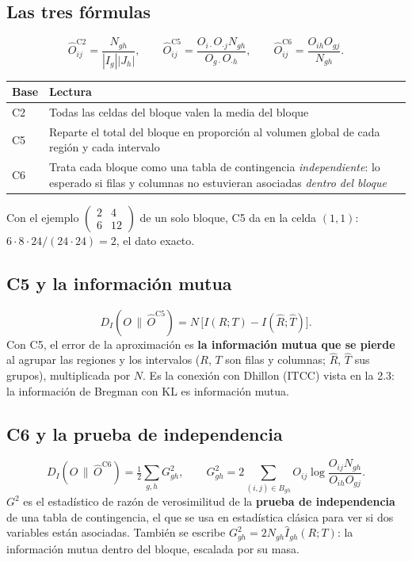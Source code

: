 \documentclass[11pt,a4paper]{article}
\begin{document}
\subsection{Las tres fórmulas}

\[
  \hat O^{\mathrm{C2}}_{ij}=\frac{N_{gh}}{|I_g||J_h|},\qquad
  \hat O^{\mathrm{C5}}_{ij}=\frac{O_{i\cdot}O_{\cdot j}N_{gh}}{O_{g\cdot}O_{\cdot h}},\qquad
  \hat O^{\mathrm{C6}}_{ij}=\frac{O_{ih}O_{gj}}{N_{gh}}.
\]
\begin{center}
\renewcommand{\arraystretch}{1.3}
\begin{tabular}{@{}l>{\raggedright\arraybackslash}p{12.4cm}@{}}
\toprule
\textbf{Base} & \textbf{Lectura} \\
\midrule
C2 & Todas las celdas del bloque valen la media del bloque \\
\midrule
C5 & Reparte el total del bloque en proporción al volumen global de cada región y cada intervalo \\
\midrule
C6 & Trata cada bloque como una tabla de contingencia \emph{independiente}: lo esperado si filas y columnas no estuvieran asociadas \emph{dentro del bloque} \\
\bottomrule
\end{tabular}
\end{center}
Con el ejemplo $\begin{pmatrix}2&4\\6&12\end{pmatrix}$ de un solo bloque, C5 da en
la celda $(1,1)$: $6\cdot8\cdot24/(24\cdot24)=2$, el dato exacto.

\subsection{C5 y la información mutua}

\[
  D_I(O\,\|\,\hat O^{\mathrm{C5}})=N\,\bigl[I(R;T)-I(\hat R;\hat T)\bigr].
\]
Con C5, el error de la aproximación es \textbf{la información mutua que se pierde}
al agrupar las regiones y los intervalos ($R$, $T$ son filas y columnas; $\hat R$,
$\hat T$ sus grupos), multiplicada por $N$. Es la conexión con Dhillon (ITCC) vista
en la 2.3: la información de Bregman con KL es información mutua.

\subsection{C6 y la prueba de independencia}

\[
  D_I(O\,\|\,\hat O^{\mathrm{C6}})=\tfrac12\sum_{g,h}G^2_{gh},\qquad
  G^2_{gh}=2\sum_{(i,j)\in B_{gh}}O_{ij}\log\frac{O_{ij}N_{gh}}{O_{ih}O_{gj}}.
\]
$G^2$ es el estadístico de razón de verosimilitud de la \textbf{prueba de
independencia} de una tabla de contingencia, el que se usa en estadística clásica
para ver si dos variables están asociadas. También se escribe
$G^2_{gh}=2N_{gh}\hat I_{gh}(R;T)$: la información mutua dentro del bloque,
escalada por su masa.
\end{document}
